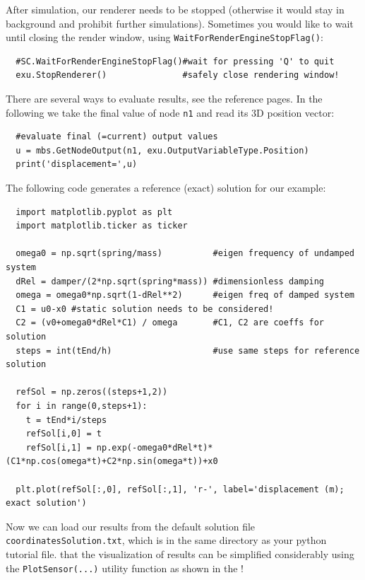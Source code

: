 After simulation, our renderer needs to be stopped (otherwise it would stay in background and prohibit further simulations). 
Sometimes you would like to wait until closing the render window, using \texttt{WaitForRenderEngineStopFlag()}:
\pythonstyle\begin{lstlisting}
  #SC.WaitForRenderEngineStopFlag()#wait for pressing 'Q' to quit
  exu.StopRenderer()               #safely close rendering window!
\end{lstlisting}
%
There are several ways to evaluate results, see the reference pages. In the following we take the final value of node \texttt{n1} and read its 3D position vector:
\pythonstyle\begin{lstlisting}
  #evaluate final (=current) output values
  u = mbs.GetNodeOutput(n1, exu.OutputVariableType.Position)
  print('displacement=',u)
\end{lstlisting}
%
The following code generates a reference (exact) solution for our example:
\pythonstyle\begin{lstlisting}
  import matplotlib.pyplot as plt
  import matplotlib.ticker as ticker

  omega0 = np.sqrt(spring/mass)          #eigen frequency of undamped system
  dRel = damper/(2*np.sqrt(spring*mass)) #dimensionless damping
  omega = omega0*np.sqrt(1-dRel**2)      #eigen freq of damped system
  C1 = u0-x0 #static solution needs to be considered!
  C2 = (v0+omega0*dRel*C1) / omega       #C1, C2 are coeffs for solution
  steps = int(tEnd/h)                    #use same steps for reference solution

  refSol = np.zeros((steps+1,2))
  for i in range(0,steps+1):
    t = tEnd*i/steps
    refSol[i,0] = t
    refSol[i,1] = np.exp(-omega0*dRel*t)*(C1*np.cos(omega*t)+C2*np.sin(omega*t))+x0

  plt.plot(refSol[:,0], refSol[:,1], 'r-', label='displacement (m); exact solution')
\end{lstlisting}
%
Now we can load our results from the default solution file \texttt{coordinatesSolution.txt}, which is in the same
directory as your python tutorial file. 
 that the visualization of results can be simplified considerably using the \texttt{PlotSensor(...)} utility function as shown in the !

